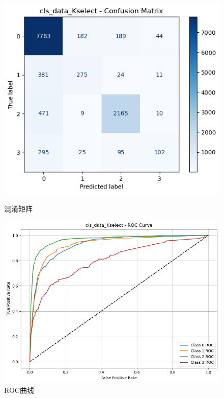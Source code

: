 \documentclass[10pt]{article}
\begin{document}
\begin{figure}[H]
\centering
\begin{minipage}[t]{0.45\textwidth}
  \centering
  \includegraphics[width=\linewidth]{cls_log_10s.png}
  \caption{混淆矩阵}
  \label{fig:37}
\end{minipage}
\hfill
\begin{minipage}[t]{0.52\textwidth}
  \centering
  \includegraphics[width=\linewidth]{cls_log_10s2.png}
  \caption{ROC曲线}
  \label{fig:38}
\end{minipage}
\end{figure}
\end{document}
